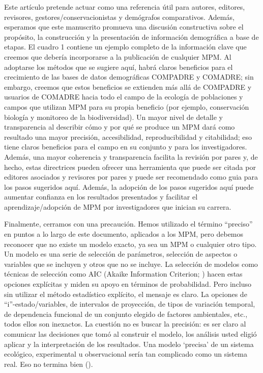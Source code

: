 \documentclass[
]{book}
\theoremstyle{definition}
\theoremstyle{definition}
\theoremstyle{definition}
\theoremstyle{definition}
\theoremstyle{remark}
\begin{document}
Este artículo pretende actuar como una referencia útil para autores, editores, revisores, gestores/conservacionistas y demógrafos comparativos. Además, esperamos que este manuscrito promueva una discusión constructiva sobre el propósito, la construcción y la presentación de información demográfica a base de etapas. El cuadro 1 contiene un ejemplo completo de la información clave que creemos que debería incorporarse a la publicación de cualquier MPM. Al adoptarse los métodos que se sugiere aquí, habrá claros beneficios para el crecimiento de las bases de datos demográficas COMPADRE y COMADRE; sin embargo, creemos que estos beneficios se extienden más allá de COMPADRE y usuarios de COMADRE hacia todo el campo de la ecología de poblaciones y campos que utilizan MPM para su propia beneficio (por ejemplo, conservación biología y monitoreo de la biodiversidad). Un mayor nivel de detalle y transparencia al describir cómo y por qué se produce un MPM dará como resultado una mayor precisión, accesibilidad, reproducibilidad y citabilidad; eso tiene claros beneficios para el campo en su conjunto y para los investigadores. Además, una mayor coherencia y transparencia facilita la revisión por pares y, de hecho, estas directrices pueden ofrecer una herramienta que puede ser citada por editores asociados y revisores por pares y puede ser recomendado como guia para los pasos sugeridos aquí. Además, la adopción de los pasos sugeridos aquí puede aumentar confianza en los resultados presentados y facilitar el aprendizaje/adopción de MPM por investigadores que inician su carrera.

Finalmente, cerramos con una precaución. Hemos utilizado el término ``preciso'' en puntos a lo largo de este documento, aplicados a los MPM, pero debemos reconocer que no existe un modelo exacto, ya sea un MPM o cualquier otro tipo. Un modelo es una serie de selección de parámetros, selección de aspectos o variables que se incluyen y otros que no se incluye. La selección de modelos como técnicas de selección como AIC (Akaike Information Criterion; \citet{anderson2002avoiding}) hacen estas opciones explícitas y miden su apoyo en términos de probabilidad. Pero incluso sin utilizar el método estadístico explícito, el mensaje es claro. La opciones de ``i''-estado/variables, de intervalos de proyección, de tipos de variación temporal, de dependencia funcional de un conjunto elegido de factores ambientales, etc., todos ellos son inexactos. La cuestión no es buscar la precisión: es ser claro al comunicar las decisiones que tomó al construir el modelo, los análisis usted eligió aplicar y la interpretación de los resultados. Una modelo `precisa' de un sistema ecológico, experimental u observacional sería tan complicado como un sistema real. Eso no termina bien (\citet{borges1999collected}).
\end{document}
